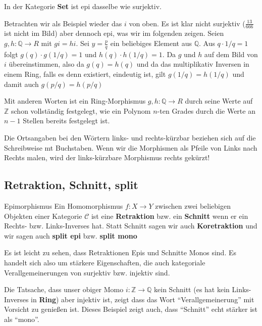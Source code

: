 \documentclass[a4paper]{amsart}
\theoremstyle{definition}
\newcommand{\Q}{\ensuremath{\mathbb{ Q }}}
\newcommand{\Z}{\ensuremath{\mathbb{ Z }}}
\newcommand{\CC}{\ensuremath{\mathcal{ C }}}
\begin{document}
In der Kategorie \textbf{Set} ist epi dasselbe wie surjektiv.

Betrachten wir als Beispiel wieder das $i$ von oben. Es ist klar nicht surjektiv ($\frac{13}{666}$ ist nicht im Bild) aber dennoch epi, was wir im folgenden zeigen.
Seien $g,h \colon \Q \to R$ mit $gi = hi$. Sei $y = \frac{p}{q}$ ein beliebiges Element aus $\Q$. Aus $q \cdot 1/q = 1$ folgt $g(q) \cdot g(1/q) = 1$ und $h(q) \cdot h(1/q) = 1$. Da $g$ und $h$ auf dem Bild von $i$ übereinstimmen, also da $g(q) = h(q)$ und da das multiplikativ Inversen in einem Ring, falls es denn existiert, eindeutig ist, gilt  $g(1/q) = h(1/q)$ und damit auch $g(p/q) = h(p/q)$

Mit anderen Worten ist ein Ring-Morphismus $g,h \colon \Q \to R$ durch seine Werte auf $\Z$ schon vollständig festgelegt, wie ein Polynom $n$-ten Grades durch die Werte an $n-1$ Stellen bereits festgelegt ist. 

Die Ortsangaben bei den Wörtern links- und rechts-kürzbar beziehen sich auf die Schreibweise mt Buchstaben. Wenn wir die Morphismen als Pfeile von Links nach Rechts malen, wird der links-kürzbare Morphismus rechts gekürzt!

\subsection{Retraktion, Schnitt, split}
\begin{Definition}{Epimorphismus}
   Ein Homomorphismus $f \colon X \to Y$ zwischen zwei beliebigen Objekten einer Kategorie $\CC$ ist eine \textbf{Retraktion} bzw. ein \textbf{Schnitt} wenn er ein Rechts- bzw. Links-Inverses hat. Statt Schnitt sagen wir auch \textbf{Koretraktion} und wir sagen auch \textbf{split epi} bzw.  \textbf{split mono}
\end{Definition}

Es ist leicht zu sehen, dass Retraktionen Epis und Schnitte Monos sind. Es handelt sich also um stärkere Eigenschaften, die auch kategoriale Verallgemeinerungen von surjektiv bzw. injektiv sind.

Die Tatsache, dass unser obiger Momo $i \colon \Z \to \Q$ kein Schnitt (es hat kein Links-Inverses in \textbf{Ring}) aber injektiv ist, zeigt dass das Wort "`Verallgemeinerung"' mit Vorsicht zu genießen ist. Dieses Beispiel zeigt auch, dass "`Schnitt"' echt stärker ist als "`mono"'.
\end{document}
